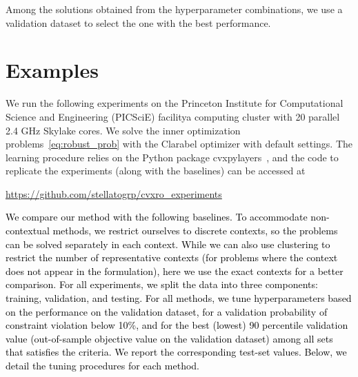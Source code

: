 \documentclass[11pt]{article}
\newcommand{\githubrepo}{\url{https://github.com/stellatogrp/cvxro_experiments}}
\newcommand{\bsnote}[1]{\noindent\textcolor{red}{\texttt{Bartolomeo: #1}}}
\newcommand{\RC}[1]{\textcolor{black}{#1}}
\begin{document}
Among the solutions obtained from the hyperparameter combinations, we use a validation dataset to select the one with the best performance. 



\section{Examples}
\label{sec:examples}
We run the following experiments on \ifpreprint the Princeton Institute for Computational Science and Engineering (PICSciE) facility\else a computing cluster \fi with 20 parallel 2.4 GHz Skylake cores. We solve the inner optimization problems~\eqref{eq:robust_prob} with the Clarabel optimizer with default settings. The learning procedure relies on the Python package cvxpylayers~\citep{cvxpylayers2019}, and 
the code to replicate the experiments (along with the baselines) can be accessed at
\begin{center}
	\githubrepo
\end{center}
\RC{We compare our method with the following baselines. To accommodate non-contextual methods, we restrict ourselves to discrete contexts, so the problems can be solved separately in each context. While we can also use clustering to restrict the number of representative contexts (for problems where the context does not appear in the formulation), here we use the exact contexts for a better comparison. For all experiments, we split the data into three components: training, validation, and testing. For all methods, we tune hyperparameters based on the performance on the validation dataset, for a validation probability of constraint violation below 10\%, and for the best (lowest) 90 percentile validation value (out-of-sample objective value on the validation dataset) among all sets that satisfies the criteria. We report the corresponding test-set values. Below, we detail the tuning procedures for each method.}
\end{document}
